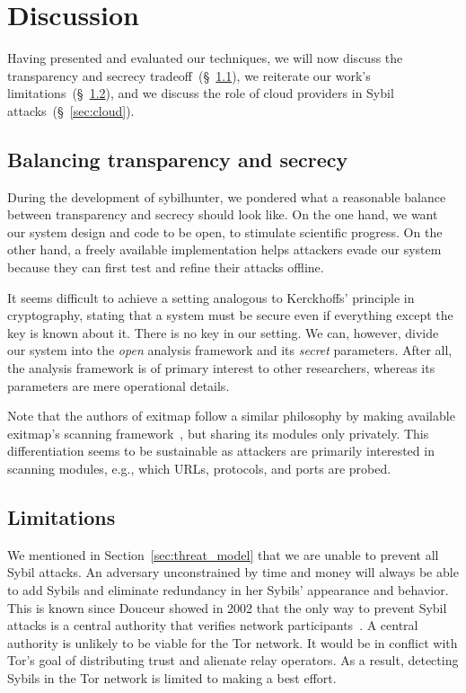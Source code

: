 \section{Discussion}
\label{sec:discussion}
Having presented and evaluated our techniques, we will now discuss the
transparency and secrecy tradeoff~(\S~\ref{sec:secrecy}), we reiterate our
work's limitations~(\S~\ref{sec:limitations}), and we discuss the role of cloud
providers in Sybil attacks~(\S~\ref{sec:cloud}).

\subsection{Balancing transparency and secrecy}
\label{sec:secrecy}
During the development of sybilhunter, we pondered what a reasonable balance
between transparency and secrecy should look like.  On the one hand, we want our
system design and code to be open, to stimulate scientific progress.  On the
other hand, a freely available implementation helps attackers evade our system
because they can first test and refine their attacks offline.

It seems difficult to achieve a setting analogous to Kerckhoffs' principle in
cryptography, stating that a system must be secure even if everything except the
key is known about it.  There is no key in our setting.  We can, however, divide
our system into the \emph{open} analysis framework and its \emph{secret}
parameters.  After all, the analysis framework is of primary interest to other
researchers, whereas its parameters are mere operational details.

Note that the authors of exitmap follow a similar philosophy by making available
exitmap's scanning framework~\cite{exitmap}, but sharing its modules only
privately.  This differentiation seems to be sustainable as attackers are
primarily interested in scanning modules, e.g., which URLs, protocols, and ports
are probed.

\subsection{Limitations}
\label{sec:limitations}
We mentioned in Section~\ref{sec:threat_model} that we are unable to prevent all
Sybil attacks.  An adversary unconstrained by time and money will always be able
to add Sybils and eliminate redundancy in her Sybils' appearance and behavior.
This is known since Douceur showed in 2002 that the only way to prevent Sybil
attacks is a central authority that verifies network
participants~\cite{Douceur2002a}.  A central authority is unlikely to be viable
for the Tor network.  It would be in conflict with Tor's goal of distributing
trust and alienate relay operators.  As a result, detecting Sybils in the Tor
network is limited to making a best effort.

